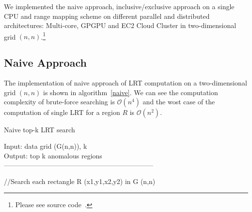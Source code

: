 \documentclass[10pt,journal,cspaper,compsoc]{IEEEtran}
\newcommand\bigo{\mathcal O}
\begin{document}
We implemented the naive approach, inclusive/exclusive approach on a single CPU and range mapping scheme on different parallel and distributed architectures: Multi-core, GPGPU and EC2 Cloud Cluster in two-dimensional grid $(n,n)$.\footnote{Please see source code~\cite{lrtsrc}.}

\subsection{Naive Approach}
The implementation of naive approach of LRT computation on a two-dimensional grid $(n,n)$ is shown in algorithm~\ref{naive}. We can see the computation complexity of brute-force searching is $\bigo(n^4)$ and the wost case of the computation of single LRT for a region $R$ is $\bigo(n^2)$.

\begin{algorithm}[t!]\small
\label{algobr1}
\caption{Naive top-k LRT search}\label{naive}
Input: data grid (G(n,n)), k\\
Output: top k anomalous regions\\
------------------------------------------------------------------ \\
\begin{algorithmic}[1]
\STATE //Search each rectangle R (x1,y1,x2,y2) in G (n,n)
\ENDFOR
\ENDFOR
\ENDFOR
\ENDFOR
{}
\end{algorithmic}
\end{algorithm}
\end{document}
